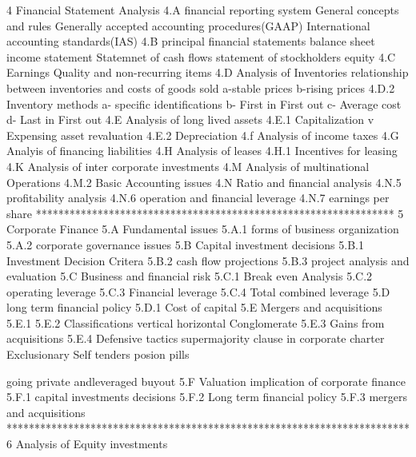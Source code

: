 4 Financial Statement Analysis
4.A financial reporting system
	General concepts and rules
	Generally accepted accounting procedures(GAAP)
	International accounting standards(IAS)
4.B principal financial statements
	balance sheet
	income statement
	Statemnet of cash flows
	statement of stockholders equity
4.C Earnings Quality and non-recurring items
4.D Analysis of Inventories
	relationship between inventories and costs of goods sold
	a-stable prices
	b-rising prices
	4.D.2 Inventory methods
		a- specific identifications
		b- First in First out
		c- Average cost
		d- Last in First out
4.E Analysis of long lived assets
	4.E.1 Capitalization v Expensing
		asset revaluation
	4.E.2 Depreciation
4.f Analysis of income taxes
4.G Analyis of financing liabilities
4.H Analysis of leases
4.H.1 Incentives for leasing
4.K Analysis of inter corporate investments
4.M Analysis of multinational Operations
4.M.2 Basic Accounting issues
4.N Ratio and financial analysis
4.N.5 profitability analysis
4.N.6 operation and financial leverage
4.N.7 earnings per share
****************************************************************
5 Corporate Finance
5.A Fundamental issues
	5.A.1 forms of business organization
	5.A.2 corporate governance issues
5.B Capital investment decisions	
	5.B.1 Investment Decision Critera
	5.B.2 cash flow projections
	5.B.3 project analysis and evaluation
5.C Business and financial risk
	5.C.1 Break even Analysis
	5.C.2 operating leverage
	5.C.3 Financial leverage
	5.C.4 Total combined leverage
5.D long term financial policy
	5.D.1 Cost of capital
5.E Mergers and acquisitions
	5.E.1
	5.E.2 Classifications
		vertical
		horizontal 
		Conglomerate
	5.E.3 Gains from acquisitions
	5.E.4 Defensive tactics
		supermajority clause in corporate charter
		Exclusionary Self tenders	
		posion pills

		going private andleveraged buyout
5.F Valuation implication of corporate finance
	5.F.1 capital investments decisions
	5.F.2 Long term financial policy
	5.F.3 mergers and acquisitions
************************************************************************
6 Analysis of Equity investments

